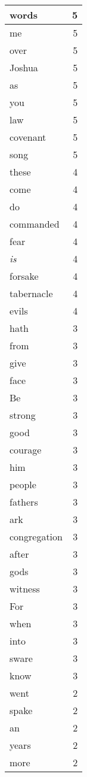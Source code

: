 \begin{center}
\begin{longtable}{l|r}
words & 5 \\ \hline
me & 5 \\ \hline
over & 5 \\ \hline
Joshua & 5 \\ \hline
as & 5 \\ \hline
you & 5 \\ \hline
law & 5 \\ \hline
covenant & 5 \\ \hline
song & 5 \\ \hline
these & 4 \\ \hline
come & 4 \\ \hline
do & 4 \\ \hline
commanded & 4 \\ \hline
fear & 4 \\ \hline
\emph{is} & 4 \\ \hline
forsake & 4 \\ \hline
tabernacle & 4 \\ \hline
evils & 4 \\ \hline
hath & 3 \\ \hline
from & 3 \\ \hline
give & 3 \\ \hline
face & 3 \\ \hline
Be & 3 \\ \hline
strong & 3 \\ \hline
good & 3 \\ \hline
courage & 3 \\ \hline
him & 3 \\ \hline
people & 3 \\ \hline
fathers & 3 \\ \hline
ark & 3 \\ \hline
congregation & 3 \\ \hline
after & 3 \\ \hline
gods & 3 \\ \hline
witness & 3 \\ \hline
For & 3 \\ \hline
when & 3 \\ \hline
into & 3 \\ \hline
sware & 3 \\ \hline
know & 3 \\ \hline
went & 2 \\ \hline
spake & 2 \\ \hline
an & 2 \\ \hline
years & 2 \\ \hline
more & 2 \\ \hline

\end{longtable}
\end{center}
